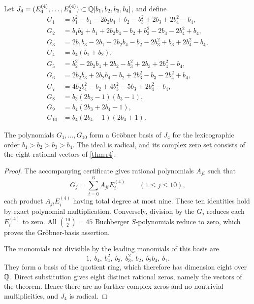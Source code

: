 Let $J_4=(E^{(4)}_0,\dots,E^{(4)}_6)\subset\mathbb{Q}[b_1,b_2,b_3,b_4]$, and define
\begin{align*}
G_1&=b_1^2-b_1-2b_2b_4+b_2-b_3^2+2b_3+2b_4^2-b_4,\\
G_2&=b_1b_2+b_1+2b_2b_4-b_2+b_3^2-2b_3-2b_4^2+b_4,\\
G_3&=2b_1b_3-2b_1-2b_2b_4-b_2-2b_3^2+b_3+2b_4^2-b_4,\\
G_4&=b_4(b_1+b_2),\\
G_5&=b_2^2-2b_2b_4+2b_2-b_3^2+2b_3+2b_4^2-b_4,\\
G_6&=2b_2b_3+2b_2b_4-b_2+2b_3^2-b_3-2b_4^2+b_4,\\
G_7&=4b_2b_4^2-b_2+4b_3^2-5b_3+2b_4^2-b_4,\\
G_8&=b_3(2b_3-1)(b_3-1),\\
G_9&=b_4(2b_3+2b_4-1),\\
G_{10}&=b_4(2b_4-1)(2b_4+1).
\end{align*}

\begin{lemma}\label{lem:r4elim}
The polynomials $G_1,\dots,G_{10}$ form a Gr\"obner basis of $J_4$ for the lexicographic order $b_1>b_2>b_3>b_4$. The ideal is radical, and its complex zero set consists of the eight rational vectors of \cref{thm:r4}.
\end{lemma}

\begin{proof}
The accompanying certificate gives rational polynomials $A_{ji}$ such that
\[
G_j=\sum_{i=0}^6A_{ji}E^{(4)}_i\qquad(1\le j\le10),
\]
each product $A_{ji}E^{(4)}_i$ having total degree at most nine. These ten identities hold by exact polynomial multiplication. Conversely, division by the $G_j$ reduces each $E^{(4)}_i$ to zero. All $\binom{10}2=45$ Buchberger $S$-polynomials reduce to zero, which proves the Gr\"obner-basis assertion.

The monomials not divisible by the leading monomials of this basis are
\[
1,\ b_4,\ b_4^2,\ b_3,\ b_3^2,\ b_2,\ b_2b_4,\ b_1.
\]
They form a basis of the quotient ring, which therefore has dimension eight over $\mathbb{Q}$. Direct substitution gives eight distinct rational zeros, namely the vectors of the theorem. Hence there are no further complex zeros and no nontrivial multiplicities, and $J_4$ is radical.
\end{proof}


